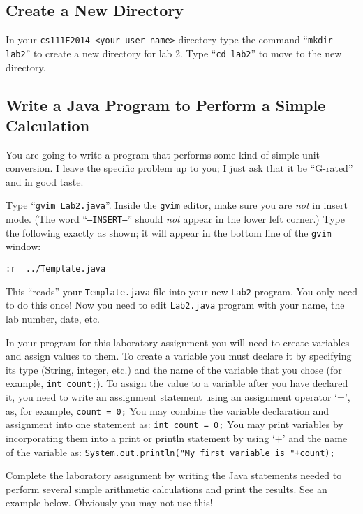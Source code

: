 \subsection*{Create a New Directory}

In your {\tt cs111F2014-<your user name>} directory type the command ``{\tt mkdir lab2}'' to create a new directory for lab 2.
\noindent Type ``{\tt cd lab2}'' to move to the new directory.  

\subsection*{Write a Java Program to Perform a Simple Calculation}
You are going to write a program that performs some kind of simple unit
conversion. I leave the specific problem up to you; I just ask that it be 
``G-rated'' and in good taste.

 Type ``{\tt gvim Lab2.java}''. Inside the
{\tt gvim} editor, make sure you are {\em not} in insert mode. (The word
``{\tt --INSERT--}'' should {\em not} appear in the lower left corner.) Type the
following exactly as shown; it will appear in the bottom line of the {\tt gvim}
window:
\begin{center}
\verb$:r  ../Template.java$
\end{center}
This ``reads'' your {\tt Template.java} file into your new {\tt Lab2} program.
You only need to do this once!  Now you need to edit {\tt Lab2.java} program with your name, the lab number, date, etc.

\noindent In your program for this laboratory assignment you will need to create variables and assign values to them. To create a variable you must declare it by specifying its type (String, integer, etc.) and the name of the variable that you chose (for example, {\tt int count;}). 
To assign the value to a variable after you have declared it, you need to write an assignment statement using an assignment operator `=', as, for example, {\tt count  = 0;} 
You may combine the variable declaration and assignment into one statement as: 
{\tt int count = 0;} 
You may print variables by incorporating them into a print or println statement by using `+' and the name of the variable as: {\tt System.out.println("My first variable is "+count);} 

 Complete the laboratory assignment by writing the Java statements needed to perform several simple
arithmetic calculations and print the results. See an example below. Obviously you may not use this!


